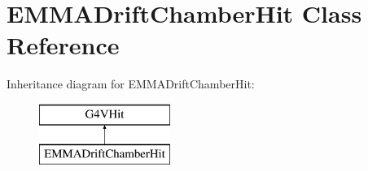 \hypertarget{classEMMADriftChamberHit}{\section{E\-M\-M\-A\-Drift\-Chamber\-Hit Class Reference}
\label{classEMMADriftChamberHit}
}
Inheritance diagram for E\-M\-M\-A\-Drift\-Chamber\-Hit\-:\begin{figure}[H]
\begin{center}
\leavevmode
\includegraphics[height=2.000000cm]{classEMMADriftChamberHit}
\end{center}
\end{figure}
